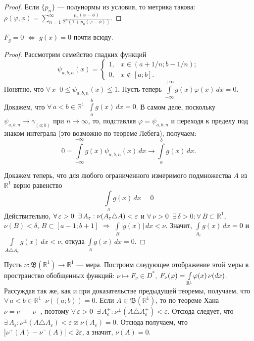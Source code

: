 \documentclass[10pt]{article}
\newcommand*{\p}[1]{#1\nobreak\discretionary{}{\hbox{$\mathsurround=0pt #1$}}{}}
\begin{document}
\begin{proof}
Если $\{p_n\}$ --- полунормы из условия, то метрика такова:
$\rho(\varphi,\phi)=\sum_{n=1}^{\infty}\frac{p_n(\varphi-\phi)}{2^n(1+p_n(\varphi-\phi))}$.
\end{proof}



\begin{prop}
$F_g=0$ $\Leftrightarrow$ $g(x)=0$ почти всюду.
\end{prop}

\begin{proof}
Рассмотрим семейство гладких функций $$ \psi_{a,b,n}(x)=
\begin{cases}
1,&\text{$x\in(a+1/n; b-1/n)$};\\
0,&\text{$x\not\in[a;b]$}.
\end{cases}$$
Понятно, что $\forall\,x\;\; 0\leqslant\psi_{a,b,n}(x)\leqslant1$.
Пусть теперь
$\int\limits_{-\infty}^{+\infty}\!g(x)\varphi(x)\,dx=0$. Докажем,
что $\forall\,a<b\in\mathbb{R}^1\;\;\int\limits_{a}^b\!g(x)\,dx=0$.
В самом деле, поскольку $\psi_{a,b,n}\to\gamma_{(a;b)}$ при
$n\to\infty$, то, подставляя $\varphi=\psi_{a,b,n}$ и переходя к
пределу под знаком интеграла (это возможно по теореме Лебега),
получаем:
$$0=\int\limits_{-\infty}^{+\infty}\!g(x)\psi_{a,b,n}(x)\,dx\to\int\limits_a^b\!
g(x)\,dx.$$

Докажем теперь, что для любого ограниченного измеримого подмножества
$A$ из $\mathbb{R}^1$ верно равенство $$\int\limits_A\!g(x)\,dx=0$$
Действительно,
$\forall\,\varepsilon\p>0\;\;\exists\,A_\varepsilon:\nu(A_\varepsilon\triangle
A)<\varepsilon$ и
$\forall\,\nu>0\;\;\exists\,\delta>0:\forall\,B\subset
\mathbb{R}^1$, $\nu(B)<\delta$, $B\subset[a-1;b+1]$ $\Rightarrow$
$\int\limits_{B}\!|g(x)|\,dx<\nu$. Значит,
$\int\limits_{A_\varepsilon}\!g(x)\,dx=0$ и $\int\limits_{A\triangle
A_\varepsilon}\!g(x)\,dx<\nu$, откуда $\int\limits_A\!g(x)\,dx=0$.
\end{proof}

Пусть $\nu\colon\mathfrak{B}(\mathbb{R}^1)\to\mathbb{R}^1$ --- мера.
Построим следующее отображение этой меры в пространство обобщенных
функций: $\nu\mapsto F_\nu\in D^*$,
$F_\nu(\varphi)\p=\int\limits_{\mathbb{R}^1}\!\varphi(x)\,\nu(dx)$.
Рассуждая так же, как и при доказательстве предыдущей теоремы,
получаем, что $\forall\,a<b\in\mathbb{R}^1\;\;\nu((a;b))=0$. Если
$A\in\mathfrak{B}(\mathbb{R}^1)$, то по теореме Хана
$\nu=\nu^+-\nu^-$, поэтому
$\forall\,\varepsilon>0\;\;\exists\,A^{\pm}_\varepsilon:\nu^\pm(A\triangle
A^\pm_\varepsilon)<\varepsilon$. Отсюда следует, что
$\exists\,A_\varepsilon:\nu^\pm(A\triangle
A_\varepsilon)<\varepsilon$ и $\nu(A_\varepsilon)=0$. Отсюда
получаем, что $|\nu^+(A)-\nu^-(A)|<2\varepsilon$, а значит,
$\nu(A)=0$.
\end{document}
